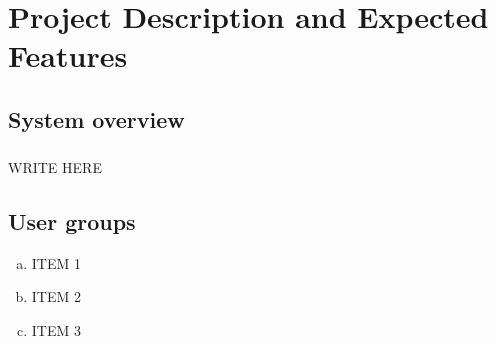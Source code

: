 \chapter{Project Description and Expected Features}
\section{System overview}
\paragraph{}WRITE HERE
\section{User groups}
\begin{enumerate}[a. ]
 \item ITEM 1
 \item ITEM 2
 \item ITEM 3
\end{enumerate}
